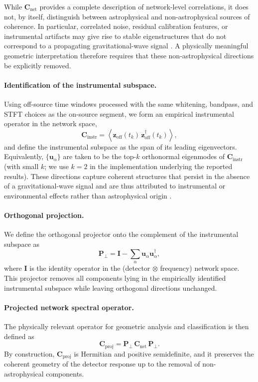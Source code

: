 \documentclass[11pt,a4paper]{article}
\begin{document}
While $\mathbf{C}_{\mathrm{net}}$ provides a complete description of network-level correlations, it does
not, by itself, distinguish between astrophysical and non-astrophysical sources of
coherence.
In particular, correlated noise, residual calibration features, or instrumental
artifacts may give rise to stable eigenstructures that do not correspond to a propagating
gravitational-wave signal \cite{Acernese2023VirgoDetCharTools, Tolley2023ArchEnemy}.
A physically meaningful geometric interpretation therefore requires that these
non-astrophysical directions be explicitly removed.

\paragraph{Identification of the instrumental subspace.}
Using off-source time windows processed with the same whitening, bandpass, and STFT
choices as the on-source segment, we form an empirical instrumental operator in the
network space,
\begin{equation}
\mathbf{C}_{\mathrm{instr}} = \left\langle \mathbf{z}_{\mathrm{off}}(t_k)\,\mathbf{z}_{\mathrm{off}}^\dagger(t_k) \right\rangle,
\end{equation}
and define the instrumental subspace as the span of its leading eigenvectors.
Equivalently, $\{\mathbf{u}_\alpha\}$ are taken to be the top-$k$ orthonormal eigenmodes of
$\mathbf{C}_{\mathrm{instr}}$ (with small $k$; we use $k=2$ in the implementation underlying the reported results).
These directions capture coherent structures that persist in the absence of a
gravitational-wave signal and are thus attributed to instrumental or environmental
effects rather than astrophysical origin \cite{Acernese2023VirgoDetCharTools}.

\paragraph{Orthogonal projection.}
We define the orthogonal projector onto the complement of the instrumental subspace as
\begin{equation}
\mathbf{P}_\perp
=
\mathbf{I}
-
\sum_\alpha
\mathbf{u}_\alpha \mathbf{u}_\alpha^\dagger ,
\end{equation}
where $\mathbf{I}$ is the identity operator in the (detector $\otimes$ frequency) network space.
This projector removes all components lying in the empirically identified instrumental
subspace while leaving orthogonal directions unchanged.

\paragraph{Projected network spectral operator.}
The physically relevant operator for geometric analysis and classification is then
defined as
\begin{equation}
\mathbf{C}_{\mathrm{proj}}
=
\mathbf{P}_\perp \, \mathbf{C}_{\mathrm{net}} \, \mathbf{P}_\perp .
\end{equation}
By construction, $\mathbf{C}_{\mathrm{proj}}$ is Hermitian and positive semidefinite, and
it preserves the coherent geometry of the detector response up to the removal of
non-astrophysical components.
\end{document}
